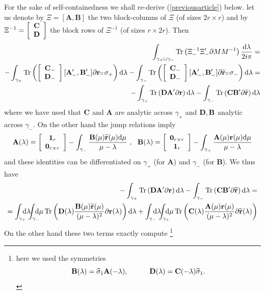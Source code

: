 \documentclass{article}
\def\ot{\hbox{\resizebox{6pt}{!}{$ \otimes \,
$}}}
\def\r{ {\mathbf r}}
\def\A{{\mathbf A}}
\def \B{{\mathbf B}}
\def \D{{\mathbf D}}
\def\s{\sigma}
\def\d{{\rm d}}
\def\1{\mathbf 1}
\def\wh{\widehat}
\def\wt{\widetilde}
\def \pa{\partial}
\def\bea{\begin{eqnarray}}
\def\eea{\end{eqnarray}}
\def\Tr{\mathop{{\rm Tr}}}
\def\0{{\mathbf 0}}
\newcommand{\be}{\begin{eqnarray}}
\newcommand{\ee}{\end{eqnarray}}
\def\le{\left}
\def\ri{\right}
\begin{document}
For the sake of self-containedness we shall re-derive (\ref{previousarticle}) below.   
let us denote by $\Xi =[\A,\B]$ the two block-columns of $\Xi$ (of sizes $2r\times r$) and by $\Xi^{-1} = \le[
\begin{array}{c}
{\bf C}\\
{\bf D}
\end{array}
\ri]$ the block rows of $\Xi^{-1}$ (of sizes $r\times 2r$). Then
%
%
\bea
 \int_{\gamma_+\cup \gamma_-} \Tr \le( \Xi_-^{-1} \Xi_-' \pa M M^{-1}
	\ri) \frac {\d\lambda}{2i\pi} =\\-
 \int_{\gamma_+} \Tr \le( \le[
\begin{array}{c}
{\bf C}_-\\
{\bf D}_-
\end{array}
\ri][\A'_-,\B'_-] \pa  \r \ot \s_+\ri)\d\lambda -
 \int_{\gamma_-} \Tr \le( \le[
\begin{array}{c}
{\bf C}_-\\
{\bf D}_-
\end{array}
\ri][\A'_-,\B'_-] \pa  \wt \r \ot \s_-\ri)\d\lambda
=\\-
 \int_{\gamma_+} \Tr \le(
{\bf D}\A'  \pa \r \ri)\d\lambda 
-
 \int_{\gamma_-} \Tr \le(
{\bf C}\B'  \pa \wt \r \ri)\d\lambda 
\eea
where we have used that ${\bf C}$ and $\A$ are analytic across $\gamma_+$ and ${\bf D}, \B$ analytic across $\gamma_-$.  
On the other hand the jump relations imply
\be
\A(\lambda) = \le[\begin{array}{c}
\1_r\\
\0_{r\times r}
\end{array}\ri] -
\int_{\gamma_-} \frac {\B(\mu) \wt \r(\mu)\d\mu}{\mu-\lambda}\ ,\ \ 
 \B(\lambda) = \le[\begin{array}{c}
\0_{r\times r}\\
\1_r
\end{array}\ri] -
\int_{\gamma_+} \frac {\A(\mu) \r(\mu)\d\mu}{\mu-\lambda}
\ee
and these identities can be differentiated on $\gamma_+$ (for $\A$) and $\gamma_-$ (for $\B$). We thus have 
\be
-
 \int_{\gamma_+} \Tr \le(
{\bf D}\A'  \pa \r\ri)\d\lambda -
 \int_{\gamma_-} \Tr \le(
{\bf C}\B'  \pa \wt \r \ri)\d\lambda 
=\\
=
 \int_{\gamma_+}\!\!\!\! \d\lambda \!\!\! \int_{\gamma_-} \!\!\!\!\! \d\mu \Tr \le(
{\bf D}(\lambda) \frac {\B(\mu) \wt \r(\mu)}{(\mu-\lambda)^2}   \pa \r(\lambda)\ri)\d\lambda
+
 \int_{\gamma_-}\!\!\!\! \d\lambda \!\!\! \int_{\gamma_+} \!\!\!\!\! \d\mu \Tr \le(
{\bf C}(\lambda) \frac {\A(\mu) \r(\mu)}{(\mu-\lambda)^2}   \pa \wt \r(\lambda)\ri) 
\ee
On the other hand these two terms exactly compute \footnote{here we used the symmetries 
$$\B(\lambda)=\wh \sigma_1\A(-\lambda),\quad\quad\quad \D(\lambda)={\bf C}(-\lambda)\wh \sigma_1.$$}
\end{document}

